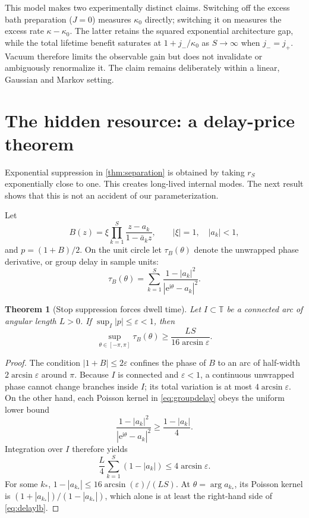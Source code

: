 \documentclass[11pt]{article}
\newtheorem{theorem}{Theorem}[section]
\theoremstyle{definition}
\theoremstyle{remark}
\newcommand{\T}{\mathbb{T}}
\newcommand{\e}{\mathrm{e}}
\begin{document}
This model makes two experimentally distinct claims.  Switching off the
excess bath preparation ($J=0$) measures $\kappa_0$ directly; switching it on
measures the excess rate $\kappa-\kappa_0$.  The latter retains the squared
exponential architecture gap, while the total lifetime benefit saturates at
$1+j_-/\kappa_0$ as $S\to\infty$ when $j_-=j_+$.  Vacuum therefore limits the
observable gain but does not invalidate or ambiguously renormalize it.  The
claim remains deliberately within a linear, Gaussian and Markov setting.

\section{The hidden resource: a delay-price theorem}

Exponential suppression in \cref{thm:separation} is obtained by taking
$r_S$ exponentially close to one.  This creates long-lived internal modes.
The next result shows that this is not an accident of our parameterization.

Let
\[
 B(z)=\xi\prod_{k=1}^S\frac{z-a_k}{1-\bar a_kz},
 \qquad |\xi|=1,\quad |a_k|<1,
\]
and $p=(1+B)/2$.  On the unit circle let $\tau_B(\theta)$ denote the unwrapped
phase derivative, or group delay in sample units:
\begin{equation}\label{eq:groupdelay}
 \tau_B(\theta)=\sum_{k=1}^S
 \frac{1-|a_k|^2}{|\e^{\mathrm{i}\theta}-a_k|^2}.
\end{equation}

\begin{theorem}[Stop suppression forces dwell time]\label{thm:delay}
Let $I\subset\T$ be a connected arc of angular length $L>0$.  If
$\sup_I|p|\leq\varepsilon<1$, then
\begin{equation}\label{eq:delaylb}
 \sup_{\theta\in[-\pi,\pi]}\tau_B(\theta)
 \geq \frac{LS}{16\arcsin\varepsilon}.
\end{equation}
\end{theorem}

\begin{proof}
The condition $|1+B|\leq2\varepsilon$ confines the phase of $B$ to an arc of
half-width $2\arcsin\varepsilon$ around $\pi$.  Because $I$ is connected and
$\varepsilon<1$, a continuous unwrapped phase cannot change branches inside
$I$; its total variation is at most $4\arcsin\varepsilon$.  On the other hand,
each Poisson kernel in \eqref{eq:groupdelay} obeys the uniform lower bound
\[
 \frac{1-|a_k|^2}{|\e^{\mathrm{i}\theta}-a_k|^2}
 \geq\frac{1-|a_k|}{4}.
\]
Integration over $I$ therefore yields
\[
 \frac{L}{4}\sum_{k=1}^S(1-|a_k|)
 \leq4\arcsin\varepsilon.
\]
For some $k_*$,
$1-|a_{k_*}|\leq16\arcsin(\varepsilon)/(LS)$.  At
$\theta=\arg a_{k_*}$, its Poisson kernel is
$(1+|a_{k_*}|)/(1-|a_{k_*}|)$, which alone is at least the right-hand side of
\eqref{eq:delaylb}.
\end{proof}
\end{document}
